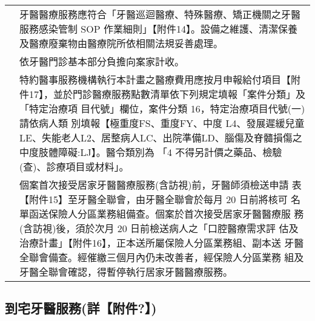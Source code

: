 \begin{longtable}{p{1.3in}p{4.8in}}
\color{OliveGreen}{感染管制}
& 牙醫醫療服務應符合「牙醫巡迴醫療、特殊醫療、矯正機關之牙醫服務感染管制 SOP 作業細則」【附件14】。設備之維護、清潔保養及醫療廢棄物由醫療院所依相關法規妥善處理。\\

\color{OliveGreen}{部分負擔}
& 依牙醫門診基本部分負擔向案家計收。\\

\color{OliveGreen}{醫療費用}
& 特約醫事服務機構執行本計畫之醫療費用應按月申報給付項目【附件17】，並於門診醫療服務點數清單依下列規定填報「案件分類」及「特定治療項 目代號」欄位，案件分類 16，特定治療項目代號(一)請依病人類 別填報【極重度FS、重度FY、中度 L4、發展遲緩兒童LE、失能老人L2、居整病人LC、出院準備LD、腦傷及脊髓損傷之中度肢體障礙:LJ】。醫令類別為
「4 不得另計價之藥品、檢驗(查)、診療項目或材料」。\\



\color{OliveGreen}{相關規範}
& 個案首次接受居家牙醫醫療服務(含訪視)前，牙醫師須檢送申請
表【附件15】至牙醫全聯會，由牙醫全聯會於每月 20 日前將核可 名單函送保險人分區業務組備查。個案於首次接受居家牙醫醫療服 務(含訪視)後，須於次月 20 日前檢送病人之「口腔醫療需求評 估及治療計畫」【附件16】，正本送所屬保險人分區業務組、副本送 牙醫全聯會備查。經催繳三個月內仍未改善者，經保險人分區業務 組及牙醫全聯會確認，得暫停執行居家牙醫醫療服務。



\end{longtable}


\subsection{到宅牙醫服務(詳【附件?】)}


\setlength{\tabcolsep}{8pt}

